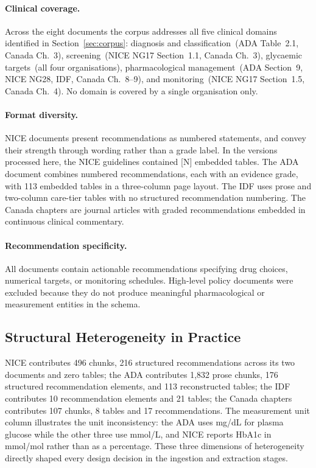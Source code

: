 \paragraph{Clinical coverage.}
Across the eight documents the corpus addresses all five clinical domains
identified in Section~\ref{sec:corpus}: diagnosis and classification~(ADA
Table~2.1, Canada Ch.~3), screening~(NICE NG17 Section~1.1, Canada Ch.~3),
glycaemic targets~(all four organisations), pharmacological management~(ADA
Section~9, NICE NG28, IDF, Canada Ch.~8--9), and monitoring~(NICE NG17
Section~1.5, Canada Ch.~4). No domain is covered by a single organisation only.

\paragraph{Format diversity.}
NICE documents present recommendations as numbered statements, and convey
their strength through wording rather than a grade label. In the versions
processed here, the NICE guidelines contained [N] embedded tables. The ADA
document combines numbered recommendations, each with an evidence grade, with
113 embedded tables in a three-column page layout. The IDF uses prose and two-column
care-tier tables with no structured recommendation numbering. The Canada
chapters are journal articles with graded recommendations embedded in
continuous clinical commentary.

\paragraph{Recommendation specificity.}
All documents contain actionable recommendations specifying drug choices,
numerical targets, or monitoring schedules. High-level policy documents were
excluded because they do not produce meaningful pharmacological or measurement
entities in the schema.

\subsection{Structural Heterogeneity in Practice}
\label{sec:heterogeneity-practice}

NICE contributes 496 chunks, 216 structured recommendations across its two documents and
zero tables; the ADA contributes 1,832 prose chunks, 176 structured
recommendation elements, and 113 reconstructed tables; the IDF
contributes 10 recommendation elements and 21 tables; the Canada chapters
contributes 107 chunks, 8 tables and 17 recommendations. The measurement unit column illustrates the
unit inconsistency: the ADA uses mg/dL for plasma glucose while the other
three use mmol/L, and NICE reports HbA1c in mmol/mol rather than as a
percentage. These three dimensions of heterogeneity directly shaped every
design decision in the ingestion and extraction stages.

